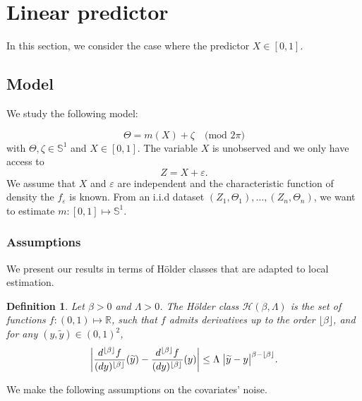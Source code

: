 \documentclass[11pt,a4paper,openany]{article}
\newtheorem{definition}[thm]{Definition}
\begin{document}
\section{Linear predictor} \label{section-linear}
In this section, we consider the case where the predictor $X \in [0,1]$.
 \subsection{Model}
 We study the following  model:

$$
\Theta= m(X) + \zeta \quad  \textrm{(mod $2\pi$)}
$$
with $\Theta, \zeta \in \mathbb{S}^1$ and $X \in [0,1]$. The variable $X$ is unobserved and we only have access to 
$$
Z = X + \varepsilon.
$$
 We assume that  $X$ and $\varepsilon$ are independent and  the  characteristic function of density the $f_\varepsilon$  is known. 
 From an i.i.d dataset $(Z_1, \Theta_1), \dots, (Z_n,\Theta_n)  $, we want to estimate $m: [0,1] \mapsto \mathbb{S}^1$.

\subsubsection{Assumptions}

We present our results in terms of  H\"older classes that are adapted to local estimation.
\begin{definition}\label{definition:holder.class} 
	{Let $\beta > 0$ and $\Lambda > 0$. The H\"older class $\mathcal{H}(\beta,\Lambda)$ is the set of functions $f : (0,1) \longmapsto \mathbb{R}$, such that $f$ admits derivatives up to the order $\lfloor \beta \rfloor$, and for any $(y,\widetilde{y})\in(0,1)^2$,
		\begin{align*}
			\left| \dfrac{ d^{\lfloor \beta \rfloor} f }{ (d y )^{\lfloor \beta \rfloor} } (\widetilde{y}) - \dfrac{ d^{\lfloor \beta \rfloor} f }{ (d y)^{\lfloor \beta \rfloor} } (y) \right|  \leq  \Lambda  \hspace{0.1cm}   \big|\widetilde{y}-y\big|^{\beta - \lfloor \beta \rfloor}  .
		\end{align*}
} \end{definition}
\noindent

We make the following assumptions on the covariates' noise.
\end{document}
